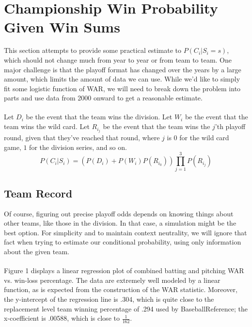 \documentclass[11pt]{article}
\begin{document}
\section{Championship Win Probability Given Win Sums}

This section attempts to provide some practical estimate to $P(C_i | S_i = s)$, which should not change much from year to year or from team to team. One major challenge is that the playoff format has changed over the years by a large amount, which limits the amount of data we can use. While we'd like to simply fit some logistic function of WAR, we will need to break down the problem into parts and use data from 2000 onward to get a reasonable estimate.\\\\
Let $D_i$ be the event that the team wins the division. Let $W_i$ be the event that the team wins the wild card. Let $R_{i_{j}}$ be the event that the team wins the $j$'th playoff round, given that they've reached that round, where $j$ is $0$ for the wild card game, $1$ for the division series, and so on.
$$P(C_i|S_i) = (P(D_i)+ P(W_i)P(R_{i_0}))\prod_{j=1}^{3}{P(R_{i_{j}})}$$

\subsection{Team Record}

Of course, figuring out precise playoff odds depends on knowing things about other teams, like those in the division. In that case, a simulation might be the best option. For simplicity and to maintain context neutrality, we will ignore that fact when trying to estimate our conditional probability, using only information about the given team.\\\\
Figure 1 displays a linear regression plot of combined batting and pitching WAR vs. win-loss percentage. The data are extremely well modeled by a linear function, as is expected from the construction of the WAR statistic. Moreover, the y-intercept of the regression line is .304, which is quite close to the replacement level team winning percentage of .294 used by BaseballReference; the x-coefficient is .00588, which is close to $\frac{1}{162}$.\\
\end{document}
